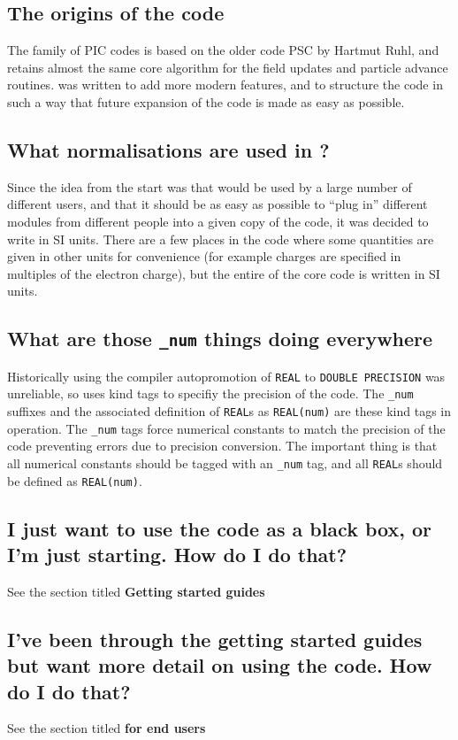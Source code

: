 \documentclass[12pt,a4paper]{article}
\newcommand{\code}[1]{{\texttt{#1}}}
\newcommand{\EPOCH}{{\color{warwickdark}\fontfamily{phv}\selectfont{EPOCH}}}
\begin{document}
\subsection{The origins of the code}
The {\EPOCH} family of PIC codes is based on the older code PSC by Hartmut Ruhl,
and retains almost the same core algorithm for the field updates and particle
advance routines. {\EPOCH} was written to add more modern features, and to
structure the code in such a way that future expansion of the code is made as
easy as possible.

\subsection{What normalisations are used in {\EPOCH}?}
Since the idea from the start was that {\EPOCH} would be used by a large number
of different users, and that it should be as easy as possible to ``plug in''
different modules from different people into a given copy of the code, it was
decided to write {\EPOCH} in SI units. There are a few places in the code where
some quantities are given in other units for convenience (for example charges
are specified in multiples of the electron charge), but the entire of the core
code is written in SI units.

\subsection{What are those \code{\_num} things doing everywhere}
Historically using the compiler autopromotion of \code{REAL} to
\code{DOUBLE PRECISION} was unreliable, so {\EPOCH} uses kind tags to specifiy
the precision of the code. The \code{\_num} suffixes and the associated
definition of \code{REAL}s as \code{REAL(num)} are these kind tags in
operation. The \code{\_num} tags force numerical constants to match the
precision of the code preventing errors due to precision conversion. The
important thing is that all numerical constants should be tagged with an
\code{\_num} tag, and all \code{REAL}s should be defined as \code{REAL(num)}.

\subsection{I just want to use the code as a black box, or I'm just
  starting. How do I do that?}
See the section titled {\bf Getting started guides}

\subsection{I've been through the getting started guides but want more detail
  on using the code. How do I do that?}
See the section titled {\bf {\EPOCH} for end users}
\end{document}
